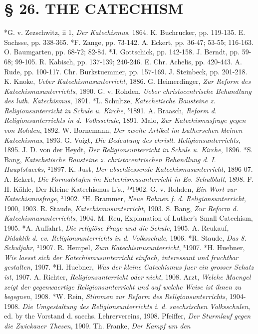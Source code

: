 \chapter{§ 26. THE CATECHISM}

*G. v. Zezschwitz, ii 1, \emph{Der Katechismus}, 1864. K. Buchrucker, pp. 119-135. E. Sachsse, pp. 338-365. *F. Zange, pp. 73-142. A. Eckert, pp. 36-47; 53-55; 116-163. O. Baumgarten, pp. 68-72; 82-84. *J. Gottschick, pp. 142-158. J. Berndt, pp. 59-68; 99-105. R. Kabisch, pp. 137-139; 240-246. E. Chr. Achelis, pp. 420-443. A. Rude, pp. 100-117. Chr. Burkstuemmer, pp. 157-169. J. Steinbeck, pp. 201-218. K. Knoke, \emph{Ueber Katechismusunterricht}, 1886. G. Heimerdinger, \emph{Zur Reform des Katechismusunterrichts}, 1890. G. v. Rohden, \emph{Ueber christocentrische Behandlung des luth. Katechismus}, 1891. *L. Schultze, \emph{Katechetische Bausteine z. Religionsunterricht in Schule u. Kirche}, ⁵1891. A. Braasch, \emph{Reform d. Religionsunterrichts in d. Volksschule}, 1891. Malo, \emph{Zur Katechismusfrage gegen von Rohden}, 1892. W. Bornemann, \emph{Der zweite Artikel im Lutherschen kleinen Katechismus}, 1893. G. Voigt, \emph{Die Bedeutung des christl. Religionsunterrichts}, 1895. J. D. von der Heydt, \emph{Der Religionsunterricht in Schule u. Kirche}, 1896. *S. Bang, \emph{Katechetische Bausteine z. christocentrischen Behandlung d. I. Hauptstuecks}, ²1897. K. Just, \emph{Der abschliessende Katechismusunterricht}, 1896-07. A. Eckert, \emph{Die Formalstufen im Katechismusunterricht in Ev. Schulblatt}, 1898. F. H. Kähle, Der Kleine Katechismus L's., ¹⁹1902. G. v. Rohden, \emph{Ein Wort zur Katechismusfrage}, ³1902. *H. Brammer, \emph{Neue Bahnen f. d. Religionsunterricht}, 1900, 1903. R. Staude, \emph{Katechismusunterricht}, 1903. S. Bang, \emph{Zur Reform d. Katechismusunterrichts}, 1904. M. Reu, Explanation of Luther's Small Catechism, 1905. *A. Auffahrt, \emph{Die religiöse Frage und die Schule}, 1905. A. Reukauf, \emph{Didaktik d. ev. Religionsunterrichts in d. Volksschule}, 1906. *R. Staude, \emph{Das 8. Schuljahr}, ³1907. R. Hempel, \emph{Zum Katechismusunterricht}, ⁵1907. *H. Huebner, \emph{Wie laesst sich der Katechismusunterricht einfach, interessant und fruchtbar gestalten}, 1907. *H. Huebner, \emph{Was der kleine Catechismus fuer ein grosser Schatz ist}, 1907. A. Richter, \emph{Religionsunterricht oder nicht}, 1908. Arzt, \emph{Welche Maengel zeigt der gegenwaertige Religionsunterricht und auf welche Weise ist ihnen zu begegnen}, 1908. *W. Rein, \emph{Stimmen zur Reform des Religionsunterrichts}, 1904-1908. \emph{Die Umgestaltung des Religionsunterrichts i. d. saechsischen Volksschulen}, ed. by the Vorstand d. saechs. Lehrervereins, 1908. Pfeiffer, \emph{Der Sturmlauf gegen die Zwickauer Thesen}, 1909. Th. Franke, \emph{Der Kampf um den}
